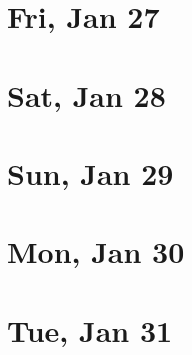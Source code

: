	\section{Fri, Jan 27}
		
		
	\section{Sat, Jan 28}
		
		
	\section{Sun, Jan 29}
		
		
	\section{Mon, Jan 30}
		
		
	\section{Tue, Jan 31}
		
		
